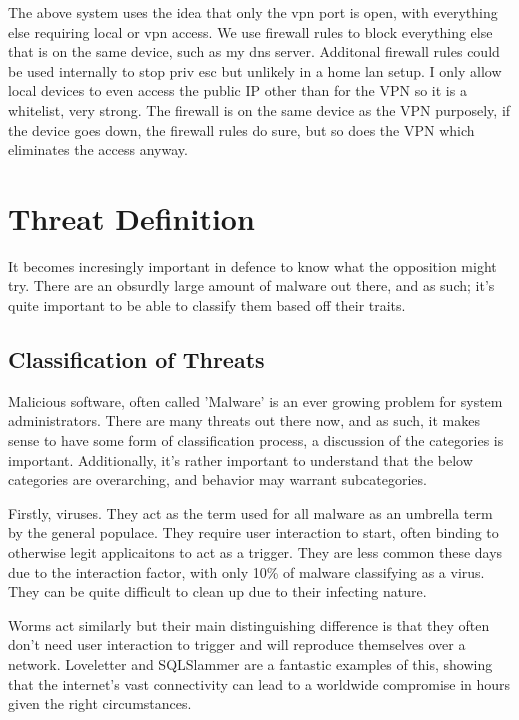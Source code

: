The above system uses the idea that only the vpn port is open, with everything else requiring local or vpn access. We use firewall rules to block everything else that is on the same device, such as my dns server. Additonal firewall rules could be used internally to stop priv esc 
but unlikely in a home lan setup. I only allow local devices to even access the public IP other than for the VPN so it is a whitelist, very strong. The firewall is on the same device as the VPN purposely, if the device goes down, the firewall rules do sure, but so does the VPN which eliminates the access anyway.

\section{Threat Definition}
It becomes incresingly important in defence to know what the opposition might try. There are an obsurdly large amount of malware out there, and as such; it's quite important to be able to classify them based off their traits.

\subsection{Classification of Threats}
Malicious software, often called 'Malware' is an ever growing problem for system administrators. There are many threats out there now, and as such, it makes sense to have some form of classification process, a discussion of the categories is 
important. Additionally, it's rather important to understand that the below categories are overarching, and behavior may warrant subcategories. \citep{MalwareClass} 

Firstly, viruses. They act as the term used for all malware as an umbrella term by the general populace.
They require user interaction to start, often binding to otherwise legit applicaitons to act as a trigger. They are less common these days due to the interaction factor, with only 10\% of malware classifying as a virus. They can be quite difficult to clean up due to their infecting nature. \citep{MalwareClass}

Worms act similarly but their main distinguishing difference is that they often don't need user interaction to trigger and will reproduce themselves over a network. Loveletter and SQLSlammer are a fantastic examples of this, showing that the internet's vast connectivity
can lead to a worldwide compromise in hours given the right circumstances. \citep{MalwareClass} 

